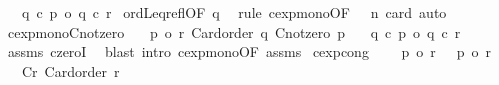 \begin{isabellebody}
\ \ \ {\isachardoublequoteopen}q\ {\isacharcircum}{\kern0pt}c\ p{}\ {\isasymle}o\ q\ {\isacharcircum}{\kern0pt}c\ r{}{\isachardoublequoteclose}\isanewline
%
\isadelimproof
%
\endisadelimproof
%
\isatagproof
{}\isamarkupfalse%
\ ordLeq{\isacharunderscore}{\kern0pt}refl{\isacharbrackleft}{\kern0pt}OF\ q{\isacharbrackright}{\kern0pt}\ \isamarkupfalse%
\ {\isacharparenleft}{\kern0pt}rule\ cexp{\isacharunderscore}{\kern0pt}mono{\isacharbrackleft}{\kern0pt}OF\ {\isacharunderscore}{\kern0pt}\ {}\ n\ card{\isacharbrackright}{\kern0pt}{\isacharparenright}{\kern0pt}\ auto%
\endisatagproof
{\isafoldproof}%
%
\isadelimproof
\isanewline
%
\endisadelimproof
\isanewline
{}\isamarkupfalse%
\ cexp{\isacharunderscore}{\kern0pt}mono{}{\isacharunderscore}{\kern0pt}Cnotzero{\isacharcolon}{\kern0pt}\isanewline
\ \ \ {\isachardoublequoteopen}p{}\ {\isasymle}o\ r{}{\isachardoublequoteclose}\ {\isachardoublequoteopen}Card{\isacharunderscore}{\kern0pt}order\ q{\isachardoublequoteclose}\ {\isachardoublequoteopen}Cnotzero\ p{}{\isachardoublequoteclose}\isanewline
\ \ \ {\isachardoublequoteopen}q\ {\isacharcircum}{\kern0pt}c\ p{}\ {\isasymle}o\ q\ {\isacharcircum}{\kern0pt}c\ r{}{\isachardoublequoteclose}\isanewline
%
\isadelimproof
%
\endisadelimproof
%
\isatagproof
{}\isamarkupfalse%
\ assms{\isacharparenleft}{\kern0pt}{}{\isacharparenright}{\kern0pt}\ czeroI\ \isamarkupfalse%
\ {\isacharparenleft}{\kern0pt}blast\ intro{\isacharcolon}{\kern0pt}\ cexp{\isacharunderscore}{\kern0pt}mono{}{\isacharprime}{\kern0pt}{\isacharbrackleft}{\kern0pt}OF\ assms{\isacharparenleft}{\kern0pt}{}{\isacharcomma}{\kern0pt}{}{\isacharparenright}{\kern0pt}{\isacharbrackright}{\kern0pt}{\isacharparenright}{\kern0pt}%
\endisatagproof
{\isafoldproof}%
%
\isadelimproof
\isanewline
%
\endisadelimproof
\isanewline
{}\isamarkupfalse%
\ cexp{\isacharunderscore}{\kern0pt}cong{\isacharcolon}{\kern0pt}\isanewline
\ \ \ {}{\isacharcolon}{\kern0pt}\ {\isachardoublequoteopen}p{}\ {\isacharequal}{\kern0pt}o\ r{}{\isachardoublequoteclose}\ \ {}{\isacharcolon}{\kern0pt}\ {\isachardoublequoteopen}p{}\ {\isacharequal}{\kern0pt}o\ r{}{\isachardoublequoteclose}\isanewline
\ \ \ Cr{\isacharcolon}{\kern0pt}\ {\isachardoublequoteopen}Card{\isacharunderscore}{\kern0pt}order\ r{}{\isachardoublequoteclose}\isanewline

\end{isabellebody}
